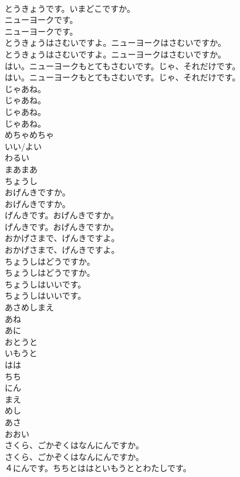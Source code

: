 \documentclass[8pt]{extreport}
\begin{document}
\begin{CJK}{UTF8}{min}
\\	とうきょうです。いまどこですか。 
\\	ニューヨークです。	
\\	ニューヨークです。 
\\	とうきょうはさむいですよ。ニューヨークはさむいですか。	
\\	とうきょうはさむいですよ。ニューヨークはさむいですか。 
\\	はい。ニューヨークもとてもさむいです。じゃ、それだけです。	
\\	はい。ニューヨークもとてもさむいです。じゃ、それだけです。 
\\	じゃあね。	
\\	じゃあね。 
\\	じゃあね。	
\\	じゃあね。 
\\	めちゃめちゃ
\\	いい/よい
\\	わるい
\\	まあまあ
\\	ちょうし
\\	おげんきですか。	
\\	おげんきですか。 
\\	げんきです。おげんきですか。	
\\	げんきです。おげんきですか。 
\\	おかげさまで、げんきですよ。	
\\	おかげさまで、げんきですよ。 
\\	ちょうしはどうですか。	
\\	ちょうしはどうですか。 
\\	ちょうしはいいです。	
\\	ちょうしはいいです。 
\\	あさめしまえ
\\	あね
\\	あに
\\	おとうと
\\	いもうと
\\	はは
\\	ちち
\\	にん
\\	まえ
\\	めし
\\	あさ
\\	おおい
\\	さくら、ごかぞくはなんにんですか。	
\\	さくら、ごかぞくはなんにんですか。 
\\	４にんです。ちちとははといもうととわたしです。	

\end{CJK}
\end{document}
